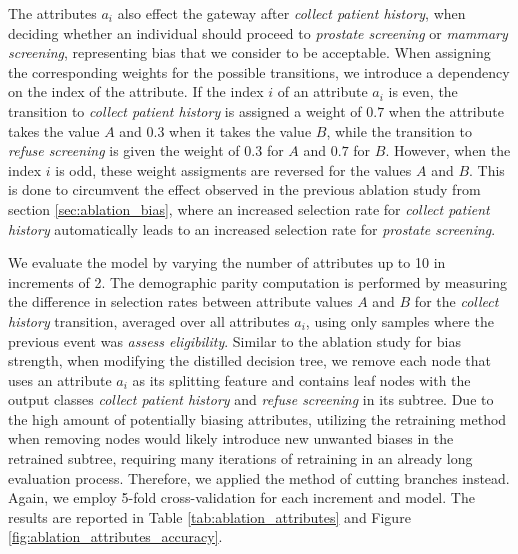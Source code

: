 The attributes $a_i$ also effect the gateway after \textit{collect patient history},
when deciding whether an individual should proceed to \textit{prostate screening} or \textit{mammary screening},
representing bias that we consider to be acceptable.
When assigning the corresponding weights for the possible transitions, we introduce a dependency on the index of the attribute.
If the index $i$ of an attribute $a_i$ is even, the transition to \textit{collect patient history} is assigned a weight of $0.7$
when the attribute takes the value $A$ and $0.3$ when it takes the value $B$,
while the transition to \textit{refuse screening} is given the weight of $0.3$ for $A$ and $0.7$ for $B$.
However, when the index $i$ is odd, these weight assigments are reversed for the values $A$ and $B$.
This is done to circumvent the effect observed in the previous ablation study from section \ref{sec:ablation_bias},
where an increased selection rate for \textit{collect patient history} automatically leads to an increased selection rate for \textit{prostate screening}.

We evaluate the model by varying the number of attributes up to 10 in increments of 2.
The demographic parity computation is performed by measuring the difference in selection rates between attribute values $A$ and $B$
for the \textit{collect history} transition, averaged over all attributes $a_i$,
using only samples where the previous event was \textit{assess eligibility}.
Similar to the ablation study for bias strength, when modifying the distilled decision tree,
we remove each node that uses an attribute $a_i$ as its splitting feature
and contains leaf nodes with the output classes \textit{collect patient history} and \textit{refuse screening} in its subtree.
Due to the high amount of potentially biasing attributes, 
utilizing the retraining method when removing nodes would likely introduce new unwanted biases in the retrained subtree,
requiring many iterations of retraining in an already long evaluation process.
Therefore, we applied the method of cutting branches instead.
Again, we employ 5-fold cross-validation for each increment and model.
The results are reported in Table \ref{tab:ablation_attributes} and Figure \ref{fig:ablation_attributes_accuracy}.


